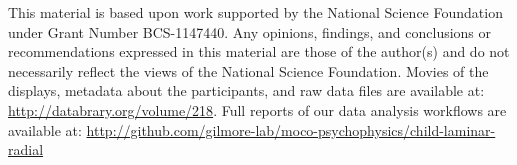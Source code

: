 \documentclass[landscape,final,paperwidth=60in,paperheight=40in,fontscale=0.285]{baposter}
\begin{document}
\begin{poster}
    {
      This material is based upon work supported by the National Science Foundation under Grant Number BCS-1147440. Any opinions, findings, and conclusions or recommendations expressed in this material are those of the author(s) and do not necessarily reflect the views of the National Science Foundation.
    }
    {
       Movies of the displays, metadata about the participants, and raw data files are available at: \url{http://databrary.org/volume/218}. Full reports of our data analysis workflows are available at: \url{http://github.com/gilmore-lab/moco-psychophysics/child-laminar-radial}
     }

  {
  \tiny
          \renewcommand{\refname}{\vspace{-0.5em}} %
          
          
}
\end{poster}
\end{document}
